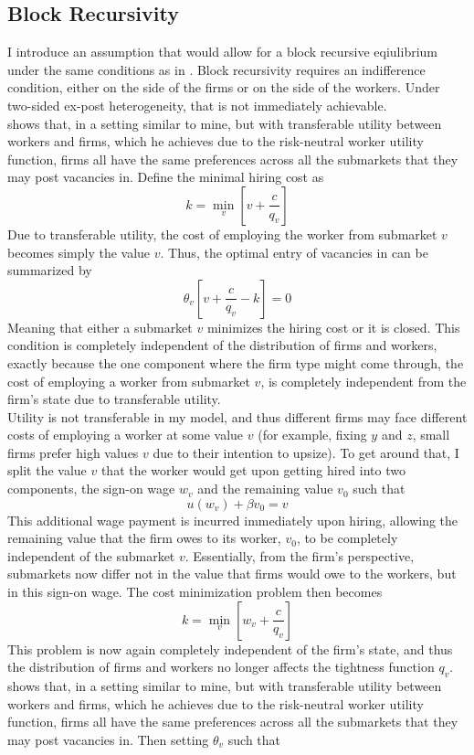\subsection{Block Recursivity} \label{blocrecur}
I introduce an assumption that would allow for a block recursive eqiulibrium under the same conditions as in \textcite{schaal2017}. Block recursivity requires an indifference condition, either on the side of the firms or on the side of the workers. Under two-sided ex-post heterogeneity, that is not immediately achievable. \\
\textcite{schaal2017} shows that, in a setting similar to mine, but with transferable utility between workers and firms, which he achieves due to the risk-neutral worker utility function, firms all have the same preferences across all the submarkets that they may post vacancies in. 
Define the minimal hiring cost as 
\[k = \min_{v} [v + \frac{c}{q_v}]\]
Due to transferable utility, the cost of employing the worker from submarket $v$ becomes simply the value $v$. Thus, the optimal entry of vacancies in \textcite{schaal2017} can be summarized by 
\[\theta_v [v + \frac{c}{q_v} - k]=0\]
Meaning that either a submarket $v$ minimizes the hiring cost or it is closed. This condition is completely independent of the distribution of firms and workers, exactly because the one component where the firm type might come through, the cost of employing a worker from submarket $v$, is completely independent from the firm's state due to transferable utility.\\
Utility is not transferable in my model, and thus different firms may face different costs of employing a worker at some value $v$ (for example, fixing $y$ and $z$, small firms prefer high values $v$ due to their intention to upsize). To get around that, I split the value $v$ that the worker would get upon getting hired into two components, the sign-on wage $w_v$ and the remaining value $v_0$ such that
\[u(w_v)+\beta v_0= v\]
This additional wage payment is incurred immediately upon hiring, allowing the remaining value that the firm owes to its worker, $v_0$, to be completely independent of the submarket $v$. Essentially, from the firm's perspective, submarkets now differ not in the value that firms would owe to the workers, but in this sign-on wage. The cost minimization problem then becomes 
\[k = \min_{v} [w_v + \frac{c}{q_v}]\]
This problem is now again completely independent of the firm's state, and thus the distribution of firms and workers no longer affects the tightness function $q_v$.\textcite{schaal2017} shows that, in a setting similar to mine, but with transferable utility between workers and firms, which he achieves due to the risk-neutral worker utility function, firms all have the same preferences across all the submarkets that they may post vacancies in. Then setting $\theta_v$ such that 
\newpage




